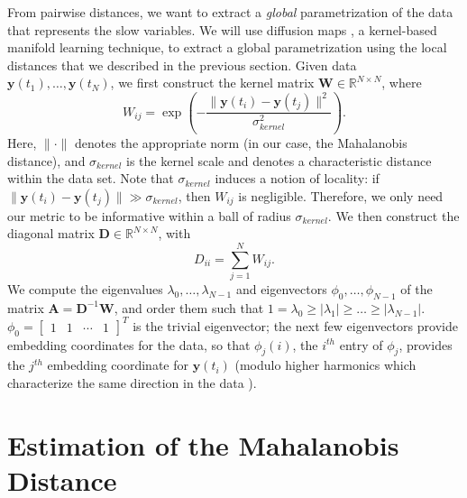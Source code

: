 From pairwise distances, we want to extract a {\em global} parametrization of the data that represents the slow variables.
%
We will use diffusion maps \cite{Coifman2006, coifman2005geometric}, a kernel-based manifold learning technique, to extract a global parametrization using the local distances that we described in the previous section.
%
Given data $\mathbf{y}(t_1), \dots, \mathbf{y}(t_N)$, we first construct the kernel matrix $\mathbf{W} \in \mathbb{R}^{N \times N}$, where
\begin{equation} \label{eq:dmaps_kernel}
W_{ij} = \exp \left( -\frac{\|\mathbf{y}(t_i) - \mathbf{y}(t_j) \|^2}{\sigma_{kernel}^2} \right).
\end{equation}
Here, $\| \cdot \|$ denotes the appropriate norm (in our case, the Mahalanobis distance), and $\sigma_{kernel}$ is the kernel scale
and denotes a characteristic distance within the data set.
%
Note that $\sigma_{kernel}$ induces a notion of locality: if $\|\mathbf{y}(t_i) - \mathbf{y}(t_j) \| \gg \sigma_{kernel}$, then $W_{ij}$ is negligible.
%
Therefore, we only need our metric to be informative within a ball of radius $\sigma _{kernel}$.
%
We then construct the diagonal matrix $\mathbf{D} \in \mathbb{R}^{N \times N}$, with
\begin{equation}
D_{ii} = \sum_{j=1}^N W_{ij}.
\end{equation}
%
We compute the eigenvalues $\lambda_0, \dots, \lambda_{N-1}$ and eigenvectors $\phi_0, \dots, \phi_{N-1}$ of the matrix $\mathbf{A} = \mathbf{D}^{-1}\mathbf{W}$, and order them such that $1 = \lambda_0 \ge |\lambda_1| \ge \dots \ge |\lambda_{N-1}|$.
%
$\phi_0 = \begin{bmatrix} 1 & 1 & \cdots & 1 \end{bmatrix}^T$
is the trivial eigenvector; the next few eigenvectors provide embedding coordinates for the data, so that $\phi_j(i)$, the $i^{th}$ entry of $\phi_j$, provides the $j^{th}$ embedding coordinate for $\mathbf{y}(t_i)$ (modulo higher harmonics which characterize
the same direction in the data \cite{ferguson2010systematic}).
%

\section{Estimation of the Mahalanobis Distance} \label{sec:analysis}

